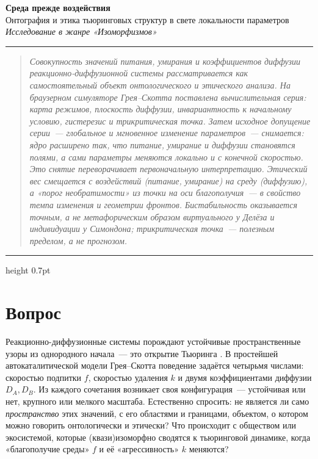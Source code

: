 \documentclass[11pt]{article}
\makeatletter
\newcommand{\rule@line}{{\color{acmag!40}\hrule height 0.7pt}}
\newcommand{\DA}{D_{\!A}}\newcommand{\DB}{D_{\!B}}
\makeatother
\begin{document}
\thispagestyle{fancy}

\begin{center}
{\sffamily\bfseries\fontsize{20}{25}\selectfont\color{acmag}
Среда прежде воздействия}\\[2mm]
{\sffamily\large\color{accyan}
Онтография и этика тьюринговых структур в свете локальности параметров}\\[6mm]
{\itshape\color{acgrey}Исследование в жанре «Изоморфизмов»}\\[2mm]
{\small\color{acgrey}\rule{40mm}{0.4pt}}
\end{center}
\vspace{2mm}

\noindent\rule@line
\begin{quotation}\small\itshape\color{acink}
Совокупность значений питания, умирания и коэффициентов диффузии реакционно-диффузионной системы
рассматривается как самостоятельный объект онтологического и этического анализа. На браузерном симуляторе
Грея–Скотта поставлена вычислительная серия: карта режимов, плоскость диффузии, инвариантность к начальному
условию, гистерезис и трикритическая точка. Затем исходное допущение серии~— глобальное и мгновенное
изменение параметров~— снимается: ядро расширено так, что питание, умирание и диффузии становятся полями,
а сами параметры меняются локально и с конечной скоростью. Это снятие переворачивает первоначальную
интерпретацию. Этический вес смещается с \emph{воздействий} (питание, умирание) на \emph{среду} (диффузию),
а «порог необратимости» из точки на оси благополучия~— в свойство темпа изменения и геометрии фронтов.
Бистабильность оказывается точным, а не метафорическим образом виртуального у Делёза и индивидуации у
Симондона; трикритическая точка~— полезным пределом, а не прогнозом.
\end{quotation}
\rule@line
\vspace{3mm}

\section{Вопрос}
Реакционно-диффузионные системы порождают устойчивые пространственные узоры из однородного начала~— это
открытие Тьюринга \cite{turing1952}. В простейшей автокаталитической модели Грея–Скотта \cite{gray1984,pearson1993}
поведение задаётся четырьмя числами: скоростью подпитки $f$, скоростью удаления $k$ и двумя коэффициентами
диффузии $\DA,\DB$. Из каждого сочетания возникает своя конфигурация~— устойчивая или нет, крупного или
мелкого масштаба. Естественно спросить: не является ли само \emph{пространство} этих значений, с его областями
и границами, объектом, о котором можно говорить онтологически и этически? Что происходит с обществом или
экосистемой, которые (квази)изоморфно сводятся к тьюринговой динамике, когда «благополучие среды» $f$ и её
«агрессивность» $k$ меняются?
\end{document}
